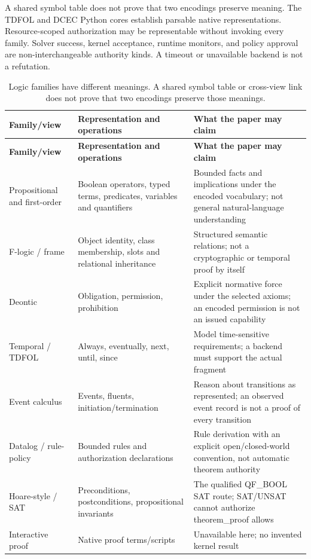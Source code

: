\documentclass{article}
\begin{document}
A shared symbol table does not prove that two encodings preserve meaning. The TDFOL and DCEC Python cores establish parsable native representations. Resource-scoped authorization may be representable without invoking every family. Solver success, kernel acceptance, runtime monitors, and policy approval are non-interchangeable authority kinds. A timeout or unavailable backend is not a refutation.
\begingroup
\renewcommand{\thetable}{B1}
\begin{longtable}{@{}>{\raggedright\arraybackslash}p{.24\linewidth} >{\raggedright\arraybackslash}p{.32\linewidth} >{\raggedright\arraybackslash}p{.38\linewidth}@{}}
\caption{Logic families have different meanings. A shared symbol table or cross-view link does not prove that two encodings preserve those meanings.}\label{tab:B1}\\
\toprule
\textbf{Family/view} & \textbf{Representation and operations} & \textbf{What the paper may claim} \\
\midrule
\endfirsthead
\textbf{Family/view} & \textbf{Representation and operations} & \textbf{What the paper may claim} \\
\midrule
\endhead
\bottomrule
\endlastfoot
Propositional and first-order & Boolean operators, typed terms, predicates, variables and quantifiers & Bounded facts and implications under the encoded vocabulary; not general natural-language understanding \\[3pt]
F-logic / frame & Object identity, class membership, slots and relational inheritance & Structured semantic relations; not a cryptographic or temporal proof by itself \\[3pt]
Deontic & Obligation, permission, prohibition & Explicit normative force under the selected axioms; an encoded permission is not an issued capability \\[3pt]
Temporal / TDFOL & Always, eventually, next, until, since & Model time-sensitive requirements; a backend must support the actual fragment \\[3pt]
Event calculus & Events, fluents, initiation/termination & Reason about transitions as represented; an observed event record is not a proof of every transition \\[3pt]
Datalog / rule-policy & Bounded rules and authorization declarations & Rule derivation with an explicit open/closed-world convention, not automatic theorem authority \\[3pt]
Hoare-style / SAT & Preconditions, postconditions, propositional invariants & The qualified QF\_BOOL SAT route; SAT/UNSAT cannot authorize theorem\_proof allows \\[3pt]
Interactive proof & Native proof terms/scripts & Unavailable here; no invented kernel result \\[3pt]
\end{longtable}
\endgroup
\end{document}

